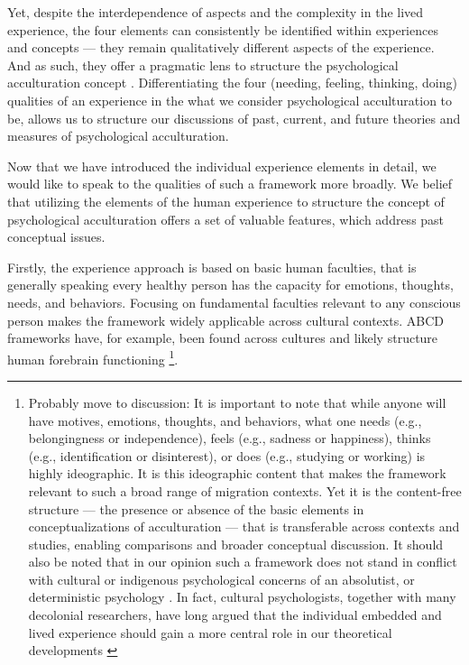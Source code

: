 \documentclass[nobib]{tufte-handout}
\begin{document}
Yet, despite the interdependence of aspects and the complexity in the lived experience, the four elements can consistently be identified within experiences and concepts --- they remain qualitatively different aspects of the experience. And as such, they offer a pragmatic lens to structure the psychological acculturation concept \citep{Kuhn1962}. Differentiating the four (needing, feeling, thinking, doing) qualities of an experience in the what we consider psychological acculturation to be, allows us to structure our discussions of past, current, and future theories and measures of psychological acculturation.

Now that we have introduced the individual experience elements in detail, we would like to speak to the qualities of such a framework more broadly. We belief that utilizing the elements of the human experience to structure the concept of psychological acculturation offers a set of valuable features, which address past conceptual issues. 

Firstly, the experience approach is based on basic human faculties, that is generally speaking every healthy person has the capacity for emotions, thoughts, needs, and behaviors. Focusing on fundamental faculties relevant to any conscious person makes the framework widely applicable across cultural contexts. ABCD frameworks have, for example, been found across cultures \citep[e.g.,][]{Bhawuk2011} and likely structure human forebrain functioning \citep{Swanson2020}\footnote{Probably move to discussion: It is important to note that while anyone will have motives, emotions, thoughts, and behaviors, what one needs (e.g., belongingness or independence), feels (e.g., sadness or happiness), thinks (e.g., identification or disinterest), or does (e.g., studying or working) is highly ideographic. It is this ideographic content that makes the framework relevant to such a broad range of migration contexts. Yet it is the content-free structure --- the presence or absence of the basic elements in conceptualizations of acculturation --- that is transferable across contexts and studies, enabling comparisons and broader conceptual discussion. It should also be noted that in our opinion such a framework does not stand in conflict with cultural or indigenous psychological concerns of an absolutist, or deterministic psychology \citep[e.g.,][]{Kim2006a}. In fact, cultural psychologists, together with many decolonial researchers, have long argued that the individual embedded and lived experience should gain a more central role in our theoretical developments \citep[e.g., ontological turn;][]{Pedersen2020}}.
\end{document}
